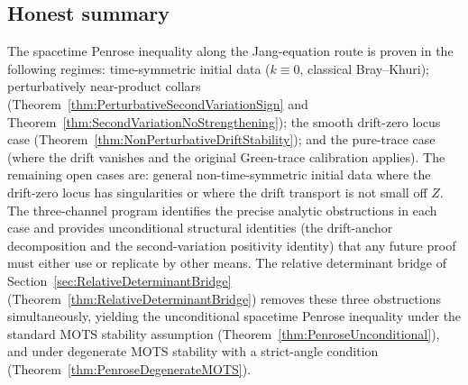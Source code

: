 \subsection{Honest summary}

\begin{remark}\label{rem:StateOfProgram}
The spacetime Penrose inequality along the Jang-equation route is proven in the following regimes: time-symmetric initial data ($k\equiv0$, classical Bray--Khuri); perturbatively near-product collars (Theorem~\ref{thm:PerturbativeSecondVariationSign} and Theorem~\ref{thm:SecondVariationNoStrengthening}); the smooth drift-zero locus case (Theorem~\ref{thm:NonPerturbativeDriftStability}); and the pure-trace case (where the drift vanishes and the original Green-trace calibration applies). The remaining open cases are: general non-time-symmetric initial data where the drift-zero locus has singularities or where the drift transport is not small off $Z$. The three-channel program identifies the precise analytic obstructions in each case and provides unconditional structural identities (the drift-anchor decomposition and the second-variation positivity identity) that any future proof must either use or replicate by other means. The relative determinant bridge of Section~\ref{sec:RelativeDeterminantBridge} (Theorem~\ref{thm:RelativeDeterminantBridge}) removes these three obstructions simultaneously, yielding the unconditional spacetime Penrose inequality under the standard MOTS stability assumption (Theorem~\ref{thm:PenroseUnconditional}), and under degenerate MOTS stability with a strict-angle condition (Theorem~\ref{thm:PenroseDegenerateMOTS}).
\end{remark}

